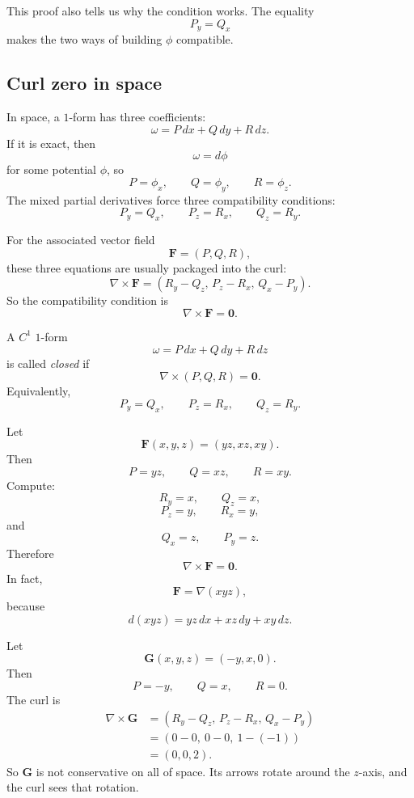 This proof also tells us why the condition works.  The equality
\[
    P_y=Q_x
\]
makes the two ways of building \(\phi\) compatible.

\subsection{Curl zero in space}

In space, a \(1\)-form has three coefficients:
\[
    \omega=P\,dx+Q\,dy+R\,dz.
\]
If it is exact, then
\[
    \omega=d\phi
\]
for some potential \(\phi\), so
\[
    P=\phi_x,\qquad Q=\phi_y,\qquad R=\phi_z.
\]
The mixed partial derivatives force three compatibility conditions:
\[
\boxed{
    P_y=Q_x,\qquad P_z=R_x,\qquad Q_z=R_y.
}
\]

For the associated vector field
\[
    \mathbf F=(P,Q,R),
\]
these three equations are usually packaged into the curl:
\[
\boxed{
    \nabla\times\mathbf F
    =
    \left(
        R_y-Q_z,\,
        P_z-R_x,\,
        Q_x-P_y
    \right).
}
\]
So the compatibility condition is
\[
\boxed{
    \nabla\times\mathbf F=\mathbf 0.
}
\]

\begin{definition}
A \(C^1\) \(1\)-form
\[
    \omega=P\,dx+Q\,dy+R\,dz
\]
is called \emph{closed} if
\[
\boxed{
    \nabla\times(P,Q,R)=\mathbf 0.
}
\]
Equivalently,
\[
    P_y=Q_x,\qquad P_z=R_x,\qquad Q_z=R_y.
\]
\end{definition}

\begin{example}
Let
\[
    \mathbf F(x,y,z)=(yz,xz,xy).
\]
Then
\[
    P=yz,\qquad Q=xz,\qquad R=xy.
\]
Compute:
\[
    R_y=x,\qquad Q_z=x,
\]
\[
    P_z=y,\qquad R_x=y,
\]
and
\[
    Q_x=z,\qquad P_y=z.
\]
Therefore
\[
    \nabla\times\mathbf F=\mathbf 0.
\]
In fact,
\[
    \mathbf F=\nabla(xyz),
\]
because
\[
    d(xyz)=yz\,dx+xz\,dy+xy\,dz.
\]
\end{example}

\begin{example}
Let
\[
    \mathbf G(x,y,z)=(-y,x,0).
\]
Then
\[
    P=-y,\qquad Q=x,\qquad R=0.
\]
The curl is
\[
\begin{aligned}
\nabla\times\mathbf G
&=
\left(
R_y-Q_z,\,
P_z-R_x,\,
Q_x-P_y
\right)\\
&=
(0-0,\ 0-0,\ 1-(-1))\\
&=
(0,0,2).
\end{aligned}
\]
So \(\mathbf G\) is not conservative on all of space.  Its arrows rotate around the
\(z\)-axis, and the curl sees that rotation.
\end{example}

